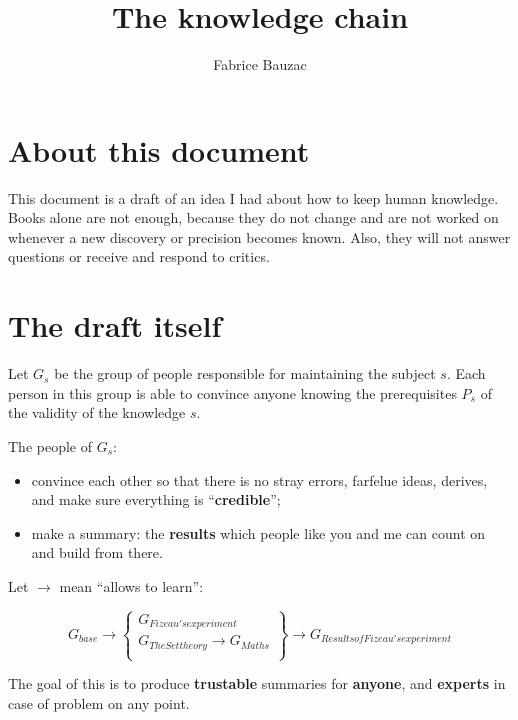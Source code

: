\documentclass{article}
\title{The knowledge chain}
\author{Fabrice {\sc Bauzac}}
\begin{document}
\maketitle

\section{About this document}

This document is a draft of an idea I had about how to keep human
knowledge.  Books alone are not enough, because they do not change and
are not worked on whenever a new discovery or precision becomes known.
Also, they will not answer questions or receive and respond to
critics.

\section{The draft itself}

Let $G_s$ be the group of people responsible for maintaining the subject $s$.  Each person in this group is able to convince anyone knowing the prerequisites $P_s$ of the validity of the knowledge $s$.

The people of $G_s$:

\begin{itemize}

\item convince each other so that there is no stray errors, farfelue
  ideas, derives, and make sure everything is ``{\bf credible}'';

\item make a summary: the {\bf results} which people like you and me
  can count on and build from there.

\end{itemize}

Let $\rightarrow$ mean ``allows to learn'':

$$G_{base} \rightarrow 
\left\lbrace
\begin{array}{c}
G_{Fizeau's experiment} \\
G_{The Set theory} \rightarrow G_{Maths} \\
\end{array}
\right\rbrace
\rightarrow G_{Results of Fizeau's experiment}$$

The goal of this is to produce {\bf trustable} summaries for {\bf
  anyone}, and {\bf experts} in case of problem on any point.
\end{document}
